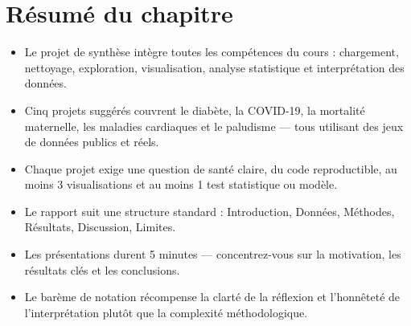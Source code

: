 \section{R\'esum\'e du chapitre}

\begin{itemize}
  \item Le projet de synth\`ese int\`egre toutes les comp\'etences du cours : chargement, nettoyage, exploration, visualisation, analyse statistique et interpr\'etation des donn\'ees.
  \item Cinq projets sugg\'er\'es couvrent le diab\`ete, la COVID-19, la mortalit\'e maternelle, les maladies cardiaques et le paludisme --- tous utilisant des jeux de donn\'ees publics et r\'eels.
  \item Chaque projet exige une question de sant\'e claire, du code reproductible, au moins 3 visualisations et au moins 1 test statistique ou mod\`ele.
  \item Le rapport suit une structure standard : Introduction, Donn\'ees, M\'ethodes, R\'esultats, Discussion, Limites.
  \item Les pr\'esentations durent 5 minutes --- concentrez-vous sur la motivation, les r\'esultats cl\'es et les conclusions.
  \item Le bar\`eme de notation r\'ecompense la clart\'e de la r\'eflexion et l'honn\^etet\'e de l'interpr\'etation plut\^ot que la complexit\'e m\'ethodologique.
\end{itemize}
